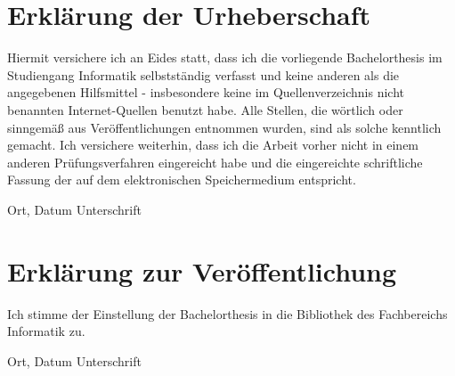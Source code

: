 \newcommand{\signature}{
    \vspace{3cm}
    Ort, Datum \hfill Unterschrift
    \vspace{3cm}
}

\section*{Erklärung der Urheberschaft}
Hiermit versichere ich an Eides statt, dass ich die vorliegende Bachelorthesis im Studiengang Informatik selbstständig verfasst und keine anderen als die angegebenen Hilfsmittel - insbesondere keine im Quellenverzeichnis nicht benannten Internet-Quellen benutzt habe. Alle Stellen, die wörtlich oder sinngemäß aus Veröffentlichungen entnommen wurden, sind als solche kenntlich gemacht. Ich versichere weiterhin, dass ich die Arbeit vorher nicht in einem anderen Prüfungsverfahren eingereicht habe und die eingereichte schriftliche Fassung der auf dem elektronischen Speichermedium entspricht.

\signature

\newpage

\section*{Erklärung zur Veröffentlichung}
Ich stimme der Einstellung der Bachelorthesis in die Bibliothek des Fachbereichs Informatik zu.

\signature